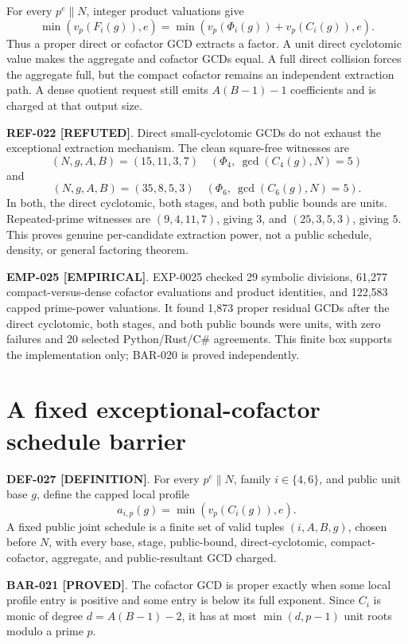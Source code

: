 \documentclass[11pt]{article}
\newcommand{\claimstatus}[2]{\textbf{#1 [#2]}}
\begin{document}
For every \(p^e\parallel N\), integer product valuations give
\[
\min(v_p(F_i(g)),e)=
\min(v_p(\Phi_i(g))+v_p(C_i(g)),e).
\]
Thus a proper direct or cofactor GCD extracts a factor. A unit direct
cyclotomic value makes the aggregate and cofactor GCDs equal. A full direct
collision forces the aggregate full, but the compact cofactor remains an
independent extraction path. A dense quotient request still emits
\(A(B-1)-1\) coefficients and is charged at that output size.

\claimstatus{REF-022}{REFUTED}. Direct small-cyclotomic GCDs do not exhaust
the exceptional extraction mechanism. The clean square-free witnesses are
\[
(N,g,A,B)=(15,11,3,7)\quad(\Phi_4,\ \gcd(C_4(g),N)=5)
\]
and
\[
(N,g,A,B)=(35,8,5,3)\quad(\Phi_6,\ \gcd(C_6(g),N)=5).
\]
In both, the direct cyclotomic, both stages, and both public bounds are
units. Repeated-prime witnesses are \((9,4,11,7)\), giving \(3\), and
\((25,3,5,3)\), giving \(5\). This proves genuine per-candidate extraction
power, not a public schedule, density, or general factoring theorem.

\claimstatus{EMP-025}{EMPIRICAL}. EXP-0025 checked 29 symbolic divisions,
61,277 compact-versus-dense cofactor evaluations and product identities,
and 122,583 capped prime-power valuations. It found 1,873 proper residual
GCDs after the direct cyclotomic, both stages, and both public bounds were
units, with zero failures and 20 selected Python/Rust/C\# agreements. This
finite box supports the implementation only; BAR-020 is proved independently.

\section{A fixed exceptional-cofactor schedule barrier}

\claimstatus{DEF-027}{DEFINITION}. For every \(p^e\parallel N\), family
\(i\in\{4,6\}\), and public unit base \(g\), define the capped local profile
\[
a_{i,p}(g)=\min(v_p(C_i(g)),e).
\]
A fixed public joint schedule is a finite set of valid tuples
\((i,A,B,g)\), chosen before \(N\), with every base, stage, public-bound,
direct-cyclotomic, compact-cofactor, aggregate, and public-resultant GCD
charged.

\claimstatus{BAR-021}{PROVED}. The cofactor GCD is proper exactly when some
local profile entry is positive and some entry is below its full exponent.
Since \(C_i\) is monic of degree \(d=A(B-1)-2\), it has at most
\(\min(d,p-1)\) unit roots modulo a prime \(p\).
\end{document}
